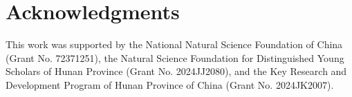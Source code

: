 \documentclass[10pt]{article}
\begin{document}
\section*{Acknowledgments}
This work was supported by the National Natural Science Foundation of China (Grant No. 72371251), the Natural Science Foundation for Distinguished Young Scholars of Hunan Province (Grant No. 2024JJ2080), and the Key Research and Development Program of Hunan Province of China (Grant No. 2024JK2007).



\end{document}
